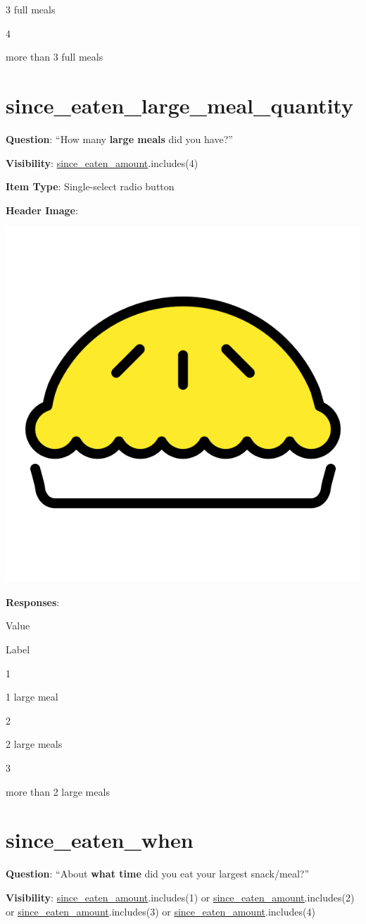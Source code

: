 \documentclass[]{book}
\begin{document}
3 full meals

4

more than 3 full meals

\hypertarget{since_eaten_large_meal_quantity}{%
\section{since\_eaten\_large\_meal\_quantity}\label{since_eaten_large_meal_quantity}}

\textbf{Question}: ``How many \textbf{large meals} did you have?''

\textbf{Visibility}: \protect\hyperlink{since_eaten_amount}{since\_eaten\_amount}.includes(4)

\textbf{Item Type}: Single-select radio button

\textbf{Header Image}:

\begin{flushleft}\includegraphics[width=0.33\linewidth]{downloadFigs4latex_NIMH_Applet_Codebook/since_eaten_large_meal_quantity_headerImg} \end{flushleft}

\textbf{Responses}:

Value

Label

1

1 large meal

2

2 large meals

3

more than 2 large meals

\hypertarget{since_eaten_when}{%
\section{since\_eaten\_when}\label{since_eaten_when}}

\textbf{Question}: ``About \textbf{what time} did you eat your largest snack/meal?''

\textbf{Visibility}: \protect\hyperlink{since_eaten_amount}{since\_eaten\_amount}.includes(1) or \protect\hyperlink{since_eaten_amount}{since\_eaten\_amount}.includes(2) or \protect\hyperlink{since_eaten_amount}{since\_eaten\_amount}.includes(3) or \protect\hyperlink{since_eaten_amount}{since\_eaten\_amount}.includes(4)
\end{document}
